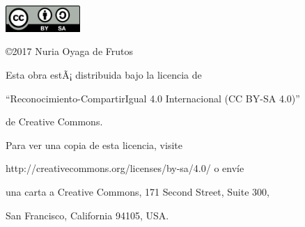 \pagebreak
\thispagestyle{empty}
\vspace*{12cm}

\begin{flushright}

\includegraphics[height=1.0cm]{figures/CC-BY-SA.png}

\vspace*{0.5cm}

\copyright 2017 Nuria Oyaga de Frutos

\vspace*{0.3cm}

Esta obra estÃ¡ distribuida bajo la licencia de 

``Reconocimiento-CompartirIgual 4.0 Internacional (CC BY-SA 4.0)''

de Creative Commons.

\vspace{0.2cm}

Para ver una copia de esta licencia, visite

http://creativecommons.org/licenses/by-sa/4.0/ o envíe

una carta a Creative Commons, 171 Second Street, Suite 300,

San Francisco, California 94105, USA.

\end{flushright}